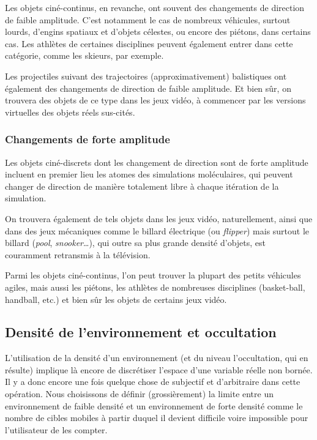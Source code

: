 	Les objets ciné-continus, en revanche, ont souvent des changements de direction de faible amplitude. C'est notamment le cas de nombreux véhicules, surtout lourds, d'engins spatiaux et d'objets célestes, ou encore des piétons, dans certains cas. Les athlètes de certaines disciplines peuvent également entrer dans cette catégorie, comme les skieurs, par exemple.
	
	Les projectiles suivant des trajectoires (approximativement) balistiques ont également des changements de direction de faible amplitude. Et bien sûr, on trouvera des objets de ce type dans les jeux vidéo, à commencer par les versions virtuelles des objets réels sus-cités.
	
	\subsubsection{Changements de forte amplitude}
	Les objets ciné-discrets dont les changement de direction sont de forte amplitude incluent en premier lieu les atomes des simulations moléculaires, qui peuvent changer de direction de manière totalement libre à chaque itération de la simulation.
	
	On trouvera également de tels objets dans les jeux vidéo, naturellement, ainsi que dans des jeux \og mécaniques \fg{}  comme le billard électrique (ou \emph{flipper}) mais surtout le billard (\emph{pool}, \emph{snooker}\ldots{}), qui outre sa plus grande densité d'objets, est couramment retransmis à la télévision.
	
	Parmi les objets ciné-continus, l'on peut trouver la plupart des petits véhicules agiles, mais aussi les piétons, les athlètes de nombreuses disciplines (basket-ball, handball, etc.) et bien sûr les objets de certains jeux vidéo.
	
	\subsection{Densité de l'environnement et occultation}
	L'utilisation de la densité d'un environnement (et du niveau l'occultation, qui en résulte) implique là encore de discrétiser l'espace d'une variable réelle non bornée. Il y a donc encore une fois quelque chose de subjectif et d'arbitraire dans cette opération. Nous choisissons de définir (grossièrement) la limite entre un environnement de faible densité et un environnement de forte densité comme le nombre de cibles mobiles à partir duquel il devient difficile voire impossible pour l'utilisateur de les compter.
	
